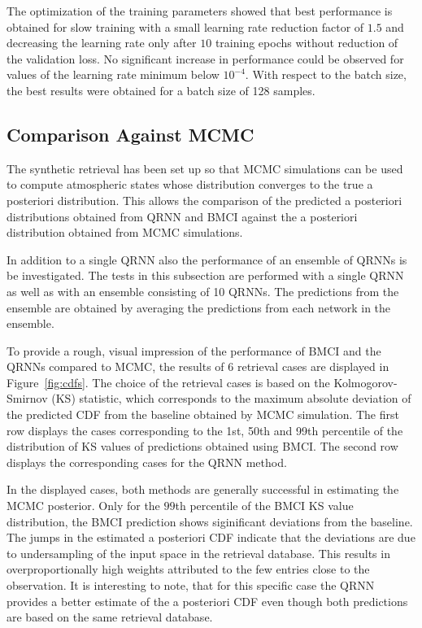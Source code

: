 \documentclass[journal abbreviation, manuscript]{copernicus}
\begin{document}
  The optimization of the training parameters showed that best performance is
  obtained for slow training with a small learning rate reduction factor of
  $1.5$ and decreasing the learning rate only after $10$ training epochs
  without reduction of the validation loss. No significant increase in
  performance could be observed for values of the learning rate minimum below
  $10^{-4}$. With respect to the batch size, the best results were obtained for
  a batch size of 128 samples.

\subsection{Comparison Against MCMC}

  The synthetic retrieval has been set up so that MCMC simulations can be used
  to compute atmospheric states whose distribution converges to the true a
  posteriori distribution. This allows the comparison of the predicted a
  posteriori distributions obtained from QRNN and BMCI against the a posteriori
  distribution obtained from MCMC simulations.

  In addition to a single QRNN also the performance of an ensemble of QRNNs is
  be investigated. The tests in this subsection are performed with a single QRNN
  as well as with an ensemble consisting of 10 QRNNs. The predictions from the
  ensemble are obtained by averaging the predictions from each network in the
  ensemble.

  To provide a rough, visual impression of the performance of BMCI and the QRNNs
  compared to MCMC, the results of 6 retrieval cases are displayed in
  Figure~\ref{fig:cdfs}. The choice of the retrieval cases is based on the
  Kolmogorov-Smirnov (KS) statistic, which corresponds to the maximum absolute
  deviation of the predicted CDF from the baseline obtained by MCMC
  simulation. The first row displays the cases corresponding to the 1st, 50th
  and 99th percentile of the distribution of KS values of predictions obtained
  using BMCI. The second row displays the corresponding cases for the QRNN
  method.

  In the displayed cases, both methods are generally successful in estimating the
  MCMC posterior. Only for the $99$th percentile of the BMCI KS value distribution,
  the BMCI prediction shows siginificant deviations from the baseline. The jumps
  in the estimated a posteriori CDF  indicate that the deviations are due to
  undersampling of the input space in the retrieval database. This results in 
  overproportionally high weights attributed to the few entries close to the
  observation. It is interesting to note, that for this specific case the QRNN
  provides a better estimate of the a posteriori CDF even though both
  predictions are based on the same retrieval database.
\end{document}
